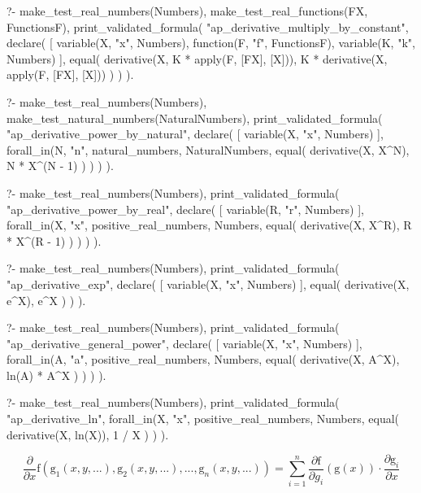 \begin{prolog}
?-	make_test_real_numbers(Numbers),
	make_test_real_functions(FX, FunctionsF),
	print_validated_formula(
		"ap_derivative_multiply_by_constant",
		declare(
			[
				variable(X, "x", Numbers),
				function(F, "f", FunctionsF),
				variable(K, "k", Numbers)
			],
			equal(
				derivative(X, K * apply(F, [FX], [X])),
				K * derivative(X, apply(F, [FX], [X]))
			)
		)
	).
\end{prolog}

\begin{prolog}
?-	make_test_real_numbers(Numbers),
	make_test_natural_numbers(NaturalNumbers),
	print_validated_formula(
		"ap_derivative_power_by_natural",
		declare(
			[
				variable(X, "x", Numbers)
			],
			forall_in(N, "n", natural_numbers, NaturalNumbers, 
				equal(
					derivative(X, X^N),
					N * X^(N - 1)
				)
			)
		)
	).
\end{prolog}

\begin{prolog}
?-	make_test_real_numbers(Numbers),
	print_validated_formula(
		"ap_derivative_power_by_real",
		declare(
			[
				variable(R, "r", Numbers)
			],
			forall_in(X, "x", positive_real_numbers, Numbers, 
				equal(
					derivative(X, X^R),
					R * X^(R - 1)
				)
			)
		)
	).
\end{prolog}

\begin{prolog}
?-	make_test_real_numbers(Numbers),
	print_validated_formula(
		"ap_derivative_exp",
		declare(
			[
				variable(X, "x", Numbers)
			],
			equal(
				derivative(X, e^X),
				e^X
			)
		)
	).
\end{prolog}

\begin{prolog}
?-	make_test_real_numbers(Numbers),
	print_validated_formula(
		"ap_derivative_general_power",
		declare(
			[
				variable(X, "x", Numbers)
			],
			forall_in(A, "a", positive_real_numbers, Numbers, 
				equal(
					derivative(X, A^X),
					ln(A) * A^X
				)
			)
		)
	).
\end{prolog}

\begin{prolog}
?-	make_test_real_numbers(Numbers),
	print_validated_formula(
		"ap_derivative_ln",
		forall_in(X, "x", positive_real_numbers, Numbers, 
			equal(
				derivative(X, ln(X)),
				1 / X
			)
		)
	).
\end{prolog}

\begin{equation}
\frac{\partial}{\partial x} \mathrm{f} (\mathrm{g}_1(x, y, ...), \mathrm{g}_2(x, y, ...), ..., \mathrm{g}_n(x, y, ...)) = \sum_{i=1}^n \frac{\partial \mathrm{f}}{\partial g_i}(\mathrm{g}(x)) \cdot \frac{\partial \mathrm{g}_i}{\partial x}
\end{equation}
